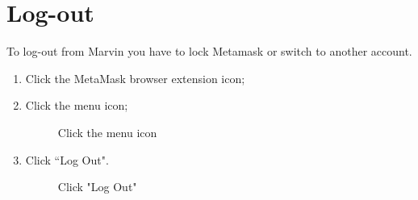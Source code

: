 \documentclass[ManualeUtente]{subfiles}
\begin{document}
\section{Log-out}
To log-out from Marvin you have to lock Metamask or switch to another account.
\begin{enumerate}
	\item Click the MetaMask browser extension icon;
	\item Click the menu icon;
	\begin{figure}[H]
		\centering
		\caption{Click the menu icon}
		\label{fig:Click the menu icon}
	\end{figure}
	\item Click \textquotedblleft Log Out".
	\begin{figure}[H]
		\centering
		\caption{Click "Log Out"}
		\label{fig:Click "Log Out"}
	\end{figure}
\end{enumerate}
\end{document}
